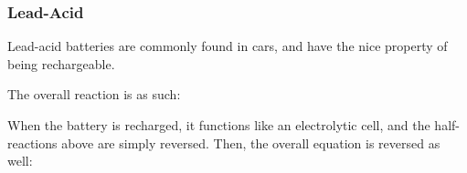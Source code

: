 			\pagebreak
			\subsubsection{Lead-Acid}

				Lead-acid batteries are commonly found in cars, and have the nice property of being rechargeable.



				The overall reaction is as such:


				When the battery is recharged, it functions like an electrolytic cell, and the half-reactions above are simply reversed. Then,
				the overall equation is reversed as well:


